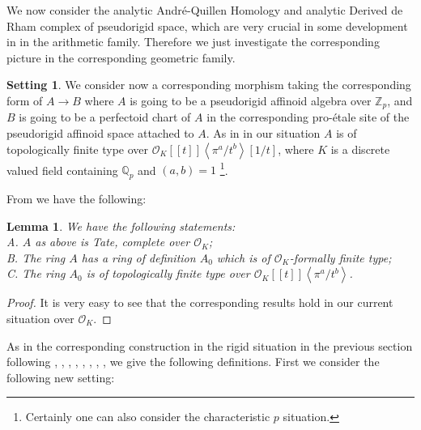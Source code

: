 \documentclass[11pt]{book}
\newtheorem{lemma}[theorem]{Lemma}
\theoremstyle{definition}
\numberwithin{equation}{section}
\newtheorem{setting}[theorem]{Setting}
\begin{document}



\indent We now consider the analytic Andr\'e-Quillen Homology and analytic Derived de Rham complex of pseudorigid space, which are very crucial in some development in \cite{12Bel1} in the arithmetic family. Therefore we just investigate the corresponding picture in the corresponding geometric family. 


\begin{setting}
We consider now a corresponding morphism taking the corresponding form of $A\rightarrow B$ where $A$ is going to be a pseudorigid affinoid algebra over $\mathbb{Z}_p$, and $B$ is going to be a perfectoid chart of $A$ in the corresponding pro-\'etale site of the pseudorigid affinoid space attached to $A$. As in \cite[Definition 3.1, and below Definition 3.1]{12Bel1} in our situation $A$ is of topologically finite type over $\mathcal{O}_K[[t]]\left<\pi^a/t^b\right>[1/t]$, where $K$ is a discrete valued field containing $\mathbb{Q}_p$ and $(a,b)=1$ \footnote{Certainly one can also consider the characteristic $p$ situation.}.	
\end{setting}

\indent From \cite[Definition 3.1, and below Definition 3.1]{12Bel1} we have the following:

\begin{lemma} We have the following statements:\\
A. $A$ as above is Tate, complete over $\mathcal{O}_K$;\\
B. The ring $A$ has a ring of definition $A_0$ which is of $\mathcal{O}_K$-formally finite type;\\
C. The ring $A_0$ is of topologically finite type over $\mathcal{O}_K[[t]]\left<\pi^a/t^b\right>$.
\end{lemma}


\begin{proof}
It is very easy to see that the corresponding results hold in our current situation over $\mathcal{O}_K$.	
\end{proof}



As in the corresponding construction in the rigid situation in the previous section following \cite[Chapitre 3]{12An1}, \cite{12An2}, \cite[Chapter 2, Chapter 8]{12B1}, \cite[Chapter 1]{12Bei}, \cite[Chapter 5]{12G1}, \cite[Chapter 3, Chapter 4]{12GL}, \cite[Chapitre II, Chapitre III]{12Ill1}, \cite[Chapitre VIII]{12Ill2}, \cite[Section 4]{12Qui} we give the following definitions. First we consider the following new setting:
\end{document}
